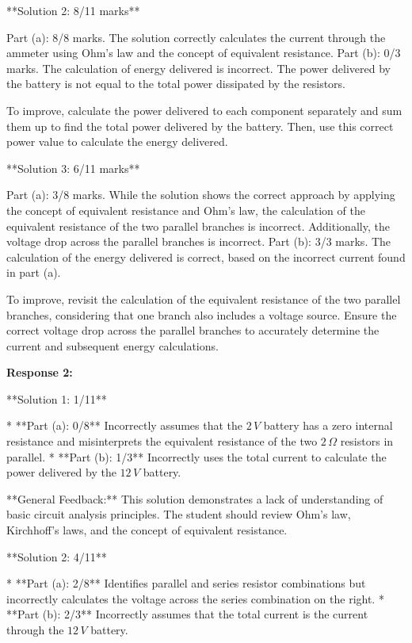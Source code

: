 \documentclass[a4paper,11pt]{article}
\begin{document}
**Solution 2: 8/11 marks**

Part (a): 8/8 marks. The solution correctly calculates the current through the ammeter using Ohm's law and the concept of equivalent resistance.
Part (b): 0/3 marks. The calculation of energy delivered is incorrect. The power delivered by the battery is not equal to the total power dissipated by the resistors.

To improve, calculate the power delivered to each component separately and sum them up to find the total power delivered by the battery. Then, use this correct power value to calculate the energy delivered.

**Solution 3: 6/11 marks**

Part (a): 3/8 marks. While the solution shows the correct approach by applying the concept of equivalent resistance and Ohm's law, the calculation of the equivalent resistance of the two parallel branches is incorrect. Additionally, the voltage drop across the parallel branches is incorrect.
Part (b): 3/3 marks. The calculation of the energy delivered is correct, based on the incorrect current found in part (a).

To improve, revisit the calculation of the equivalent resistance of the two parallel branches, considering that one branch also includes a voltage source. Ensure the correct voltage drop across the parallel branches to accurately determine the current and subsequent energy calculations.


\textbf{Response 2:}

**Solution 1: 1/11**

*   **Part (a): 0/8** Incorrectly assumes that the \(2\,V\) battery has a zero internal resistance and misinterprets the equivalent resistance of the two \(2\,\Omega\) resistors in parallel.
*   **Part (b): 1/3** Incorrectly uses the total current to calculate the power delivered by the \(12\,V\) battery.

**General Feedback:** This solution demonstrates a lack of understanding of basic circuit analysis principles. The student should review Ohm's law, Kirchhoff's laws, and the concept of equivalent resistance.

**Solution 2: 4/11**

*   **Part (a): 2/8** Identifies parallel and series resistor combinations but incorrectly calculates the voltage across the series combination on the right.
*   **Part (b): 2/3** Incorrectly assumes that the total current is the current through the \(12\,V\) battery.
\end{document}
